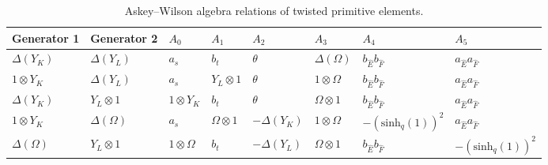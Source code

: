 \documentclass[10pt,a4paper]{amsart}
\numberwithin{equation}{section}
\newcommand{\dyone}{\Delta\left(Y_{L}\right)}
\newcommand{\dyzero}{\Delta\left(Y_{K}\right)}
\newcommand{\shq}{\mathrm{sinh}_q}
\newcommand{\yone}{Y_{L}\otimes 1}
\newcommand{\yzero}{1\otimes Y_{K}}
\begin{document}
\begin{table}[h]\centering \renewcommand{\arraystretch}{1.2}\small
	\begin{tabular}{|l|l|l|l|l|l|l|l|}
		\hline
		Generator 1 & Generator 2 & $A_0$ & $A_1$ & $A_2$ & $A_3$ & $A_4$ & $A_5$ \\ \hline
		$\dyzero$ & $\dyone$ & $a_s$ & $b_t$ & $\theta$ & $\Delta\left(\Omega\right)$ & $b_{\hat{E}}b_{\hat{F}}$ & $a_{\hat{E}}a_{\hat{F}}$ \\ \hline
		$\yzero$ & $\dyone$ & $a_s$ & $\yone$ & $\theta$ & $1\otimes\Omega$ & $b_{\hat{E}}b_{\hat{F}}$ & $a_{\hat{E}}a_{\hat{F}}$ \\ \hline
		$\dyzero$ & $\yone$ & $\yzero$ & $b_t$ & $\theta$ & $\Omega\otimes 1$ & $b_{\hat{E}}b_{\hat{F}}$ & $a_{\hat{E}}a_{\hat{F}}$ \\ \hline
		$\yzero$ & $\Delta\left(\Omega\right)$ & $a_s$ & $\Omega\otimes 1$ & $-\dyzero$ & $1\otimes\Omega$ & $-(\shq(1))^{2}$ &$a_{\hat{E}}a_{\hat{F}}$ \\ \hline
		$\Delta\left(\Omega\right)$ & $\yone$ & $1\otimes\Omega$ & $b_t$ & $-\dyone$ & $\Omega\otimes 1$ & $ b_{\hat{E}}b_{\hat{F}}$ &$-(\shq(1))^{2}$ \\ \hline
	\end{tabular}
	\caption{Askey--Wilson algebra relations of twisted primitive elements.}\label{tab:tpegenapp}
\end{table}
\end{document}
